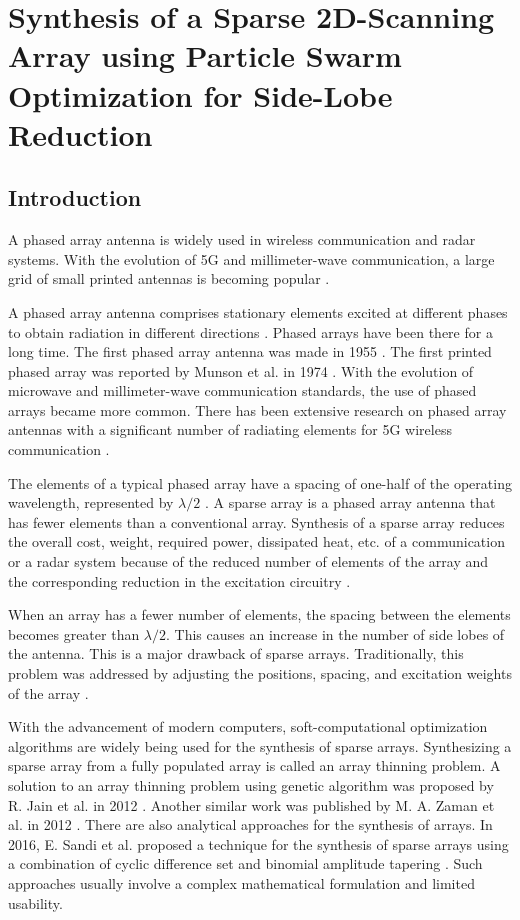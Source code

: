 \chapter{Synthesis of a Sparse 2D-Scanning Array using Particle Swarm Optimization for Side-Lobe Reduction}
\label{chap:chap5}
\section{Introduction}\label{c5sec_intro}
A phased array antenna is widely used in wireless communication and radar systems. With the evolution of 5G and millimeter-wave communication, a large grid of small printed antennas is becoming popular \cite{5gmmwave, 5gmmwave_fr4}.

A phased array antenna comprises stationary elements excited at different phases to obtain radiation in different directions \cite{phasedArrayHandbook}. Phased arrays have been there for a long time. The first phased array antenna was made in 1955 \cite{phasedArray_russia}. The first printed phased array was reported by Munson et al. in 1974 \cite{txmPhasedArray}. With the evolution of microwave and millimeter-wave communication standards, the use of phased arrays became more common. There has been extensive research on phased array antennas with a significant number of radiating elements for 5G wireless communication \cite{mmarrayRrev}.

The elements of a typical phased array have a spacing of one-half of the operating wavelength, represented by $\lambda/2$ \cite{phasedArrayHandbook}. A sparse array is a phased array antenna that has fewer elements than a conventional array. Synthesis of a sparse array reduces the overall cost, weight, required power, dissipated heat, etc. of a communication or a radar system because of the reduced number of elements of the array and the corresponding reduction in the excitation circuitry \cite{sparseDesignConstraints}.

When an array has a fewer number of elements, the spacing between the elements becomes greater than $\lambda/2$. This causes an increase in the number of side lobes of the antenna. This is a major drawback of sparse arrays. Traditionally, this problem was addressed by adjusting the positions, spacing, and excitation weights of the array \cite{sparseDesignConstraints}.

With the advancement of modern computers, soft-computational optimization algorithms are widely being used for the synthesis of sparse arrays. Synthesizing a sparse array from a fully populated array is called an array thinning problem. A solution to an array thinning problem using genetic algorithm was proposed by R. Jain et al. in 2012 \cite{thinningGA}. Another similar work was published by M. A. Zaman et al. in 2012 \cite{nunUniformLinear}. There are also analytical approaches for the synthesis of arrays. In 2016, E. Sandi et al. proposed a technique for the synthesis of sparse arrays using a combination of cyclic difference set and binomial amplitude tapering \cite{amplitudeTaperingHybrid}. Such approaches usually involve a complex mathematical formulation and limited usability.

